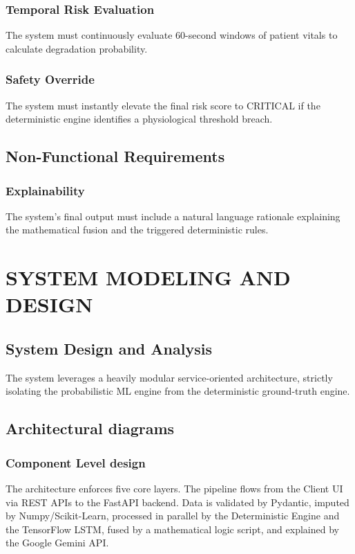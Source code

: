 \documentclass[12pt,a4paper]{report}
\begin{document}
\subsection{Temporal Risk Evaluation}
The system must continuously evaluate 60-second windows of patient vitals to calculate degradation probability.
\subsection{Safety Override}
The system must instantly elevate the final risk score to CRITICAL if the deterministic engine identifies a physiological threshold breach.

\section{Non-Functional Requirements}
\subsection{Explainability}
The system's final output must include a natural language rationale explaining the mathematical fusion and the triggered deterministic rules.

\chapter{SYSTEM MODELING AND DESIGN}

\section{System Design and Analysis}
The system leverages a heavily modular service-oriented architecture, strictly isolating the probabilistic ML engine from the deterministic ground-truth engine.

\section{Architectural diagrams}
\subsection{Component Level design}
The architecture enforces five core layers. The pipeline flows from the Client UI via REST APIs to the FastAPI backend. Data is validated by Pydantic, imputed by Numpy/Scikit-Learn, processed in parallel by the Deterministic Engine and the TensorFlow LSTM, fused by a mathematical logic script, and explained by the Google Gemini API.
\end{document}
